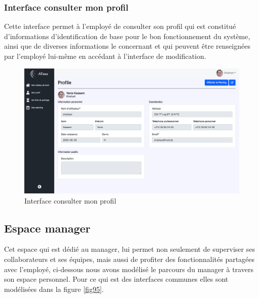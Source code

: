\vspace{-10pt}   
\subsubsection*{Interface consulter mon profil}
Cette interface permet à l’employé de consulter son profil qui est constitué
d’informations d'identification de base pour le bon fonctionnement du système,
ainsi que de diverses informations le concernant et qui peuvent être renseignées
par l’employé lui-même en accédant à l’interface de modification.

\begin{figure}[h!]
    \centering
    \includegraphics[scale=0.306 ]{images/interface/mon_profil.png}
    \caption{Interface consulter mon profil}
    \label{fig94}
\end{figure}

\clearpage

\subsection{Espace manager}
Cet espace qui est dédié au manager, lui permet non seulement de superviser ses
collaborateurs et ses équipes, mais aussi de profiter des fonctionnalités
partagées avec l’employé, ci-dessous nous avons modélisé le parcours du manager
à travers son espace personnel. Pour ce qui est des interfaces communes elles
sont modélisées dans la figure \ref{fig95}.

